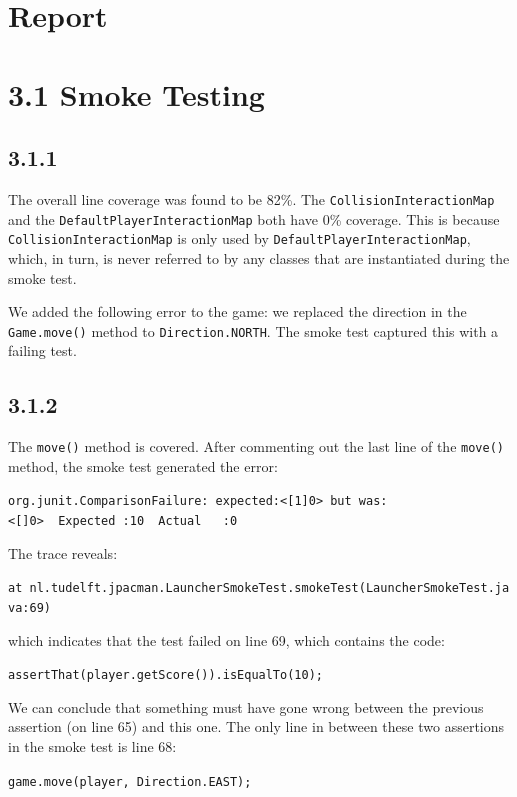 \documentclass[]{article}
\date{}
\begin{document}
\section{Report}\label{report}

\section{3.1 Smoke Testing}\label{smoke-testing}

\subsection{3.1.1}\label{section}

The overall line coverage was found to be 82\%. The
\texttt{CollisionInteractionMap} and the
\texttt{DefaultPlayerInteractionMap} both have 0\% coverage. This is
because \texttt{CollisionInteractionMap} is only used by
\texttt{DefaultPlayerInteractionMap}, which, in turn, is never referred
to by any classes that are instantiated during the smoke test.

We added the following error to the game: we replaced the direction in
the \texttt{Game.move()} method to \texttt{Direction.NORTH}. The smoke
test captured this with a failing test.

\subsection{3.1.2}\label{section-1}

The \texttt{move()} method is covered. After commenting out the last
line of the \texttt{move()} method, the smoke test generated the error:

\texttt{org.junit.ComparisonFailure:\ expected:\textless{}{[}1{]}0\textgreater{}\ but\ was:\textless{}{[}{]}0\textgreater{}\ \ Expected\ :10\ \ Actual\ \ \ :0}

The trace reveals:

\texttt{at\ nl.tudelft.jpacman.LauncherSmokeTest.smokeTest(LauncherSmokeTest.java:69)}

which indicates that the test failed on line 69, which contains the
code:

\texttt{assertThat(player.getScore()).isEqualTo(10);}

We can conclude that something must have gone wrong between the previous
assertion (on line 65) and this one. The only line in between these two
assertions in the smoke test is line 68:

\texttt{game.move(player,\ Direction.EAST);}
\end{document}

